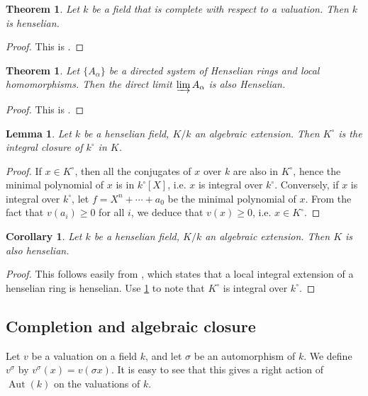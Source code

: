 \documentclass{article}
\DeclareMathOperator{\aut}{Aut}
\newtheorem{theorem}[definition]{Theorem}
\newtheorem{corollary}[definition]{Corollary}
\newtheorem{lemma}[definition]{Lemma}
\numberwithin{definition}{subsection}
\begin{document}
\begin{theorem}\label{complete-henselian}
Let $k$ be a field that is complete with respect to a valuation. Then $k$ is 
henselian. 
\end{theorem}
\begin{proof}
This is \cite[III.4.3 th.1]{Bou}. 
\end{proof}

\begin{theorem}
Let $\{A_\alpha\}$ be a directed system of Henselian rings and local 
homomorphisms. Then the direct limit $\varinjlim A_\alpha$ is also Henselian. 
\end{theorem}
\begin{proof}
This is \cite[III.4 ex.3(a)]{Bou}. 
\end{proof}

\begin{lemma}\label{valuation-ring-integral-closure}
Let $k$ be a henselian field, $K/k$ an algebraic extension. Then $K^\circ$ is 
the integral closure of $k^\circ$ in $K$. 
\end{lemma}
\begin{proof}
If $x\in K^\circ$, then all the conjugates of $x$ over $k$ are also in 
$K^\circ$, hence the minimal polynomial of $x$ is in $k^\circ[X]$, i.e. $x$ is 
integral over $k^\circ$. Conversely, if $x$ is integral over $k^\circ$, let 
$f=X^n+\cdots + a_0$ be the minimal polynomial of $x$. From the fact that 
$v(a_i)\geqslant 0$ for all $i$, we deduce that $v(x)\geqslant 0$, i.e. 
$x\in K^\circ$. 
\end{proof}

\begin{corollary}\label{ext-of-hensel-is-hensel}
Let $k$ be a henselian field, $K/k$ an algebraic extension. Then $K$ is also 
henselian. 
\end{corollary}
\begin{proof}
This follows easily from \cite[III.3 ex.3(c)]{Bou}, which states that a local 
integral extension of a henselian ring is henselian. Use 
\ref{valuation-ring-integral-closure} to note that $K^\circ$ is integral over 
$k^\circ$. 
\end{proof}





\subsection{Completion and algebraic closure}

Let $v$ be a valuation on a field $k$, and let $\sigma$ be an automorphism of 
$k$. We define $v^\sigma$ by $v^\sigma(x) = v(\sigma x)$. It is easy to see 
that this gives a right action of $\aut(k)$ on the valuations of $k$. 
\end{document}
